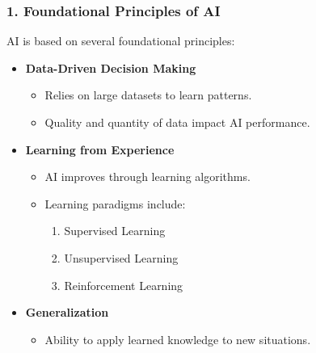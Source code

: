 \documentclass{beamer}
\begin{document}
\begin{frame}[fragile]
    \frametitle{1. Foundational Principles of AI}
    AI is based on several foundational principles:
    \begin{itemize}
        \item \textbf{Data-Driven Decision Making}
        \begin{itemize}
            \item Relies on large datasets to learn patterns.
            \item Quality and quantity of data impact AI performance.
        \end{itemize}
        
        \item \textbf{Learning from Experience}
        \begin{itemize}
            \item AI improves through learning algorithms.
            \item Learning paradigms include:
            \begin{enumerate}
                \item Supervised Learning
                \item Unsupervised Learning
                \item Reinforcement Learning
            \end{enumerate}
        \end{itemize}
        
        \item \textbf{Generalization}
        \begin{itemize}
            \item Ability to apply learned knowledge to new situations.
        \end{itemize}
    \end{itemize}
\end{frame}
\end{document}
